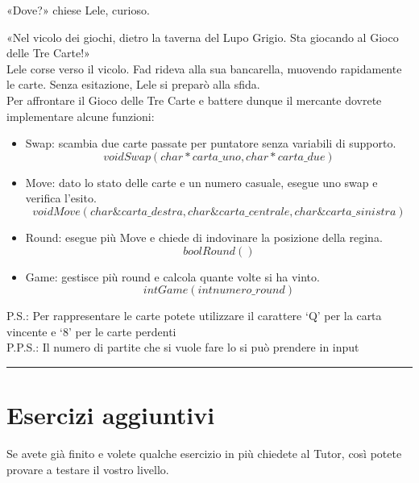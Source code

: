 \documentclass[a4paper]{article}
\begin{document}
«Dove?» chiese Lele, curioso.

«Nel vicolo dei giochi, dietro la taverna del Lupo Grigio. Sta giocando al Gioco delle Tre Carte!»\\
Lele corse verso il vicolo. Fad rideva alla sua bancarella, muovendo rapidamente le carte. Senza esitazione, Lele si preparò alla sfida.\\
Per affrontare il Gioco delle Tre Carte e battere dunque il mercante dovrete implementare alcune funzioni:
\begin{itemize}
    \item Swap: scambia due carte passate per puntatore senza variabili di supporto. \begin{equation*}void Swap(char* carta\_uno, char* carta\_due)\end{equation*}
    \item Move: dato lo stato delle carte e un numero casuale, esegue uno swap e verifica l'esito. \begin{equation*}void Move(char\& carta\_destra, char\& carta\_centrale, char\& carta\_sinistra)\end{equation*}
    \item Round: esegue più Move e chiede di indovinare la posizione della regina. \begin{equation*}bool Round()\end{equation*}
    \item Game: gestisce più round e calcola quante volte si ha vinto. \begin{equation*}int Game(int numero\_round)\end{equation*}
\end{itemize}
P.S.: Per rappresentare le carte potete utilizzare il carattere `Q' per la carta vincente e `8' per le carte perdenti\\
P.P.S.: Il numero di partite che si vuole fare lo si può prendere in input

\noindent\rule{\linewidth}{0.4pt}
\section*{Esercizi aggiuntivi}
Se avete già finito e volete qualche esercizio in più chiedete al Tutor, così potete provare a testare il vostro livello.
\end{document}
